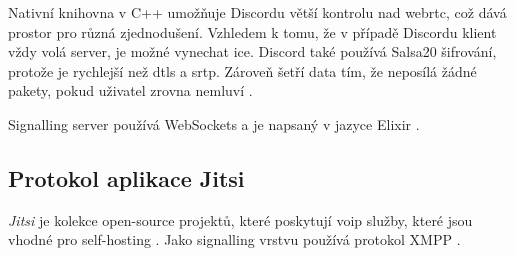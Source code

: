 Nativní knihovna v C++ umožňuje Discordu větší kontrolu nad \gls{webrtc}, což
dává prostor pro různá zjednodušení. Vzhledem k tomu, že v případě Discordu
klient vždy volá server, je možné vynechat \gls{ice}. Discord také používá
Salsa20 šifrování, protože je rychlejší než \gls{dtls} a \gls{srtp}. Zároveň
šetří data tím, že neposílá žádné pakety, pokud uživatel zrovna nemluví
\parencite{Discord-HowDoesItHandleMillionsOfUsers}.

Signalling server používá WebSockets a je napsaný v jazyce Elixir
\parencite{Discord-HowDoesItHandleMillionsOfUsers}.

\subsection{Protokol aplikace Jitsi}

\textit{Jitsi} je kolekce open-source projektů, které poskytují \gls{voip}
služby, které jsou vhodné pro self-hosting \parencite{Jitsi-Docs-Introduction}.
Jako signalling vrstvu používá protokol XMPP \parencite{XMPPORG-WebRTC}.
